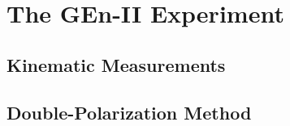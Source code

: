 \section{The GEn-II Experiment}

\subsection{Kinematic Measurements}

\subsection{Double-Polarization Method}